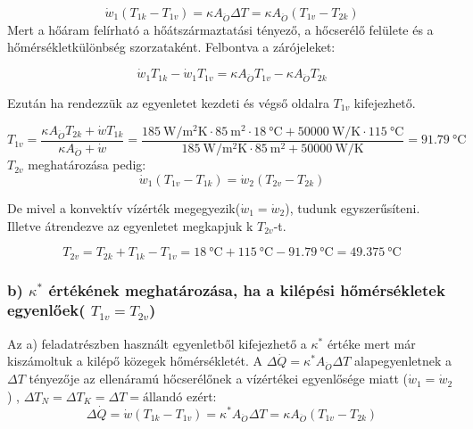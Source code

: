\begin{equation}
  \dot{w}_1\left(T_{1k} - T_{1v}\right) = \kappa A_{\ddot{O}} \Delta T = \kappa A_{\ddot{O}} \left(T_{1v} - T_{2k}\right)
 \end{equation}
Mert a hőáram felírható a hőátszármaztatási tényező, a hőcserélő felülete és a hőmérsékletkülönbség szorzataként.
Felbontva a zárójeleket:

 \begin{equation}
\dot{w}_1 T_{1k} - \dot{w}_1 T_{1v} =  \kappa A_{\ddot{O}} T_{1v} -  \kappa A_{\ddot{O}} T_{2k}
 \end{equation}


Ezután ha rendezzük az egyenletet kezdeti és végső oldalra $T_{1v}$ kifejezhető.

\begin{equation}
T_{1v} = \frac{\kappa A_{\ddot{O}} T_{2k} + \dot{w} T_{1k}}{\kappa A_{\ddot{O}} + \dot{w}} =\frac{\SI{185}{\watt\per\meter\squared\kelvin}\cdot \SI{85}{\meter\squared}\cdot \SI{18}{\celsius} + \SI{50000}{\watt\per\kelvin} \cdot \SI{115}{\celsius}}{\SI{185}{\watt\per\meter\squared\kelvin}\cdot \SI{85}{\meter\squared} + \SI{50000}{\watt\per\kelvin}}= \SI{91.79}{\celsius}
\end{equation}
$T_{2v}$ meghatározása pedig:
\begin{equation}
\dot{w}_1\left(T_{1v} - T_{1k}\right) = \dot{w}_2\left(T_{2v} - T_{2k}\right)
\end{equation}

De mivel a konvektív vízérték megegyezik($\dot{w}_1 = \dot{w}_2$), tudunk egyszerűsíteni. Illetve átrendezve az egyenletet megkapjuk k $T_{2v}$-t.

\begin{equation}
T_{2v} = T_{2k} + T_{1k} - T_{1v} = \SI{18}{\celsius} + \SI{115}{\celsius} - \SI{91.79}{\celsius} = \SI{49.375}{\celsius}
\end{equation}

\subsubsection*{b) $\kappa^*$ értékének meghatározása, ha a kilépési hőmérsékletek egyenlőek( $T_{1v} = T_{2v}$) }
Az a) feladatrészben használt egyenletből kifejezhető a $\kappa^*$ értéke mert már kiszámoltuk a kilépő közegek hőmérsékletét. A $\Delta \dot{Q}= \kappa^* A_{\ddot{O}} \Delta T$ alapegyenletnek a $\Delta T$ tényezője az ellenáramú hőcserélőnek a vízértékei egyenlősége miatt ($\dot{w}_1 = \dot{w}_2$) ,  $\Delta T_N = \Delta T_K = \Delta T = \textrm{állandó}$ ezért:
\vspace{1mm}
\begin{equation}
\Delta \dot{Q}=\dot{w}\left(T_{1k} - T_{1v}\right) = \kappa^* A_{\ddot{O}} \Delta T = \kappa A_{\ddot{O}} \left(T_{1v} - T_{2k}\right)
\end{equation}

